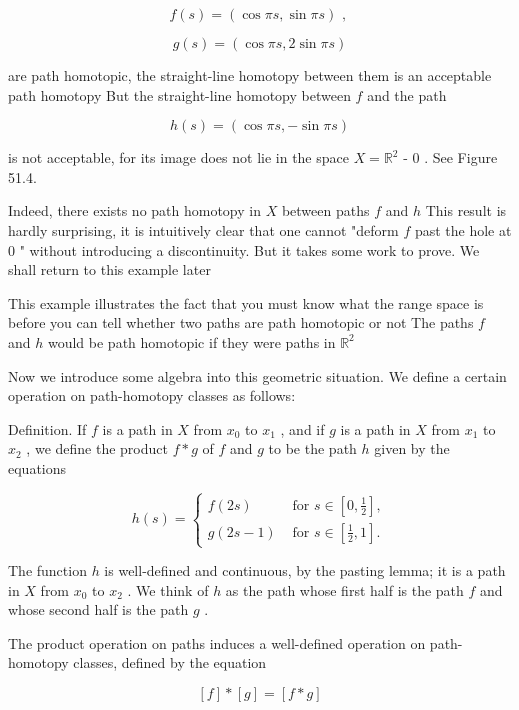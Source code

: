 \documentclass[10pt]{article}
\begin{document}
\[
f\left( s\right)  = \left( {\cos {\pi s},\sin {\pi s}}\right) \text{ , }
\]

\[
g\left( s\right)  = \left( {\cos {\pi s},2\sin {\pi s}}\right)
\]

are path homotopic, the straight-line homotopy between them is an acceptable path homotopy But the straight-line homotopy between \(f\) and the path

\[
h\left( s\right)  = \left( {\cos {\pi s}, - \sin {\pi s}}\right)
\]

is not acceptable, for its image does not lie in the space \(X = {\mathbb{R}}^{2}\) - 0 . See Figure 51.4.

Indeed, there exists no path homotopy in \(X\) between paths \(f\) and \(h\) This result is hardly surprising, it is intuitively clear that one cannot "deform \(f\) past the hole at 0 " without introducing a discontinuity. But it takes some work to prove. We shall return to this example later

This example illustrates the fact that you must know what the range space is before you can tell whether two paths are path homotopic or not The paths \(f\) and \(h\) would be path homotopic if they were paths in \({\mathbb{R}}^{2}\)

Now we introduce some algebra into this geometric situation. We define a certain operation on path-homotopy classes as follows:

Definition. If \(f\) is a path in \(X\) from \({x}_{0}\) to \({x}_{1}\) , and if \(g\) is a path in \(X\) from \({x}_{1}\) to \({x}_{2}\) , we define the product \(f * g\) of \(f\) and \(g\) to be the path \(h\) given by the equations

\[
h\left( s\right)  = \left\{  \begin{array}{ll} f\left( {2s}\right) & \text{ for }s \in  \left\lbrack  {0,\frac{1}{2}}\right\rbrack  , \\  g\left( {{2s} - 1}\right) & \text{ for }s \in  \left\lbrack  {\frac{1}{2},1}\right\rbrack  . \end{array}\right.
\]

The function \(h\) is well-defined and continuous, by the pasting lemma; it is a path in \(X\) from \({x}_{0}\) to \({x}_{2}\) . We think of \(h\) as the path whose first half is the path \(f\) and whose second half is the path \(g\) .

The product operation on paths induces a well-defined operation on path-homotopy classes, defined by the equation

\[
\left\lbrack  f\right\rbrack   * \left\lbrack  g\right\rbrack   = \left\lbrack  {f * g}\right\rbrack
\]
\end{document}
